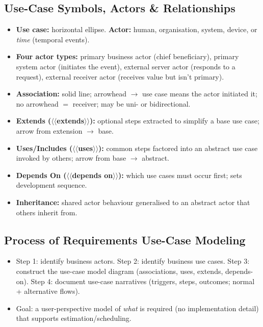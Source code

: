 \documentclass[hidelinks]{article}
\begin{document}
\subsection{Use-Case Symbols, Actors \& Relationships}
\begin{itemize}
  \item \textbf{Use case:} horizontal ellipse. \textbf{Actor:} human, organisation, system,
        device, or \emph{time} (temporal events).
  \item \textbf{Four actor types:} primary business actor (chief beneficiary), primary system actor
        (initiates the event), external server actor (responds to a request), external receiver
        actor (receives value but isn't primary).
  \item \textbf{Association:} solid line; arrowhead $\to$ use case means the actor initiated it;
        no arrowhead $=$ receiver; may be uni- or bidirectional.
  \item \textbf{Extends ($\langle\langle$extends$\rangle\rangle$):} optional steps extracted to
        simplify a base use case; arrow from extension $\to$ base.
  \item \textbf{Uses/Includes ($\langle\langle$uses$\rangle\rangle$):} common steps factored into an
        abstract use case invoked by others; arrow from base $\to$ abstract.
  \item \textbf{Depends On ($\langle\langle$depends on$\rangle\rangle$):} which use cases must occur
        first; sets development sequence.
  \item \textbf{Inheritance:} shared actor behaviour generalised to an abstract actor that others
        inherit from.
\end{itemize}

\subsection{Process of Requirements Use-Case Modeling}
\begin{itemize}
  \item Step 1: identify business actors. Step 2: identify business use cases. Step 3: construct
        the use-case model diagram (associations, uses, extends, depends-on). Step 4: document
        use-case narratives (triggers, steps, outcomes; normal + alternative flows).
  \item Goal: a user-perspective model of \emph{what} is required (no implementation detail) that
        supports estimation/scheduling.
\end{itemize}
\end{document}
